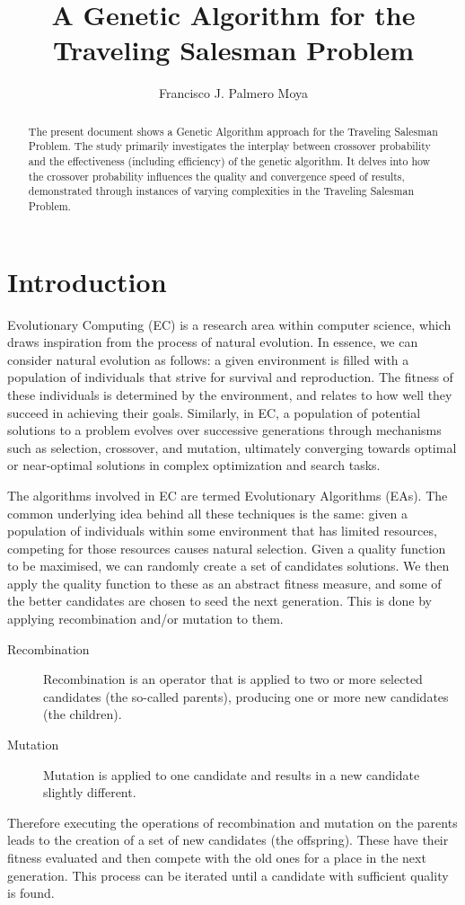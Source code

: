 \documentclass[10pt,a4paper]{article}
\title{A Genetic Algorithm for the Traveling Salesman Problem}
\author{Francisco J. Palmero Moya}
\begin{document}
\maketitle
\begin{abstract}
    The present document shows a Genetic Algorithm approach for the Traveling Salesman Problem. The study primarily investigates the interplay between crossover probability and the effectiveness (including efficiency) of the genetic algorithm. It delves into how the crossover probability influences the quality and convergence speed of results, demonstrated through instances of varying complexities in the Traveling Salesman Problem.
\end{abstract}
\section{Introduction}
Evolutionary Computing (EC) is a research area within computer science, which draws inspiration from the process of natural evolution. In essence, we can consider natural evolution as follows: a given environment is filled with a population of individuals that strive for survival and reproduction. The fitness of these individuals is determined by the environment, and relates to how well they succeed in achieving their goals. Similarly, in EC, a population of potential solutions to a problem evolves over successive generations through mechanisms such as selection, crossover, and mutation, ultimately converging towards optimal or near-optimal solutions in complex optimization and search tasks. 

The algorithms involved in EC are termed Evolutionary Algorithms (EAs). The common underlying idea behind all these techniques is the same: given a population of individuals within some environment that has limited resources, competing for those resources causes natural selection. Given a quality function to be maximised, we can randomly create a set of candidates solutions. We then apply the quality function to these as an abstract fitness measure, and some of the better candidates are chosen to seed the next generation. This is done by applying recombination and/or mutation to them.
\begin{description}
    \item[Recombination] Recombination is an operator that is applied to two or more selected candidates (the so-called parents), producing one or more new candidates (the children).
    \item[Mutation] Mutation is applied to one candidate and results in a new candidate slightly different.
\end{description}
Therefore executing the operations of recombination and mutation on the parents leads to the creation of a set of new candidates (the offspring). These have their fitness evaluated and then compete with the old ones for a place in the next generation. This process can be iterated until a candidate with sufficient quality is found.
\end{document}
